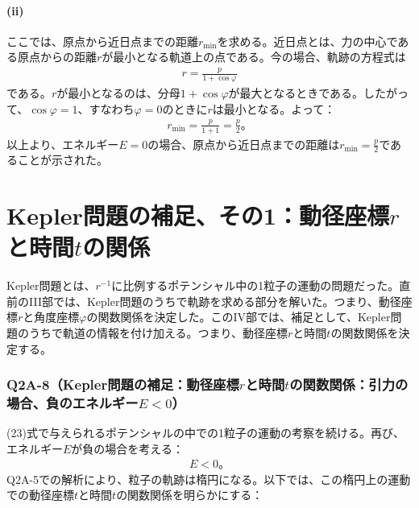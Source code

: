   \subsection*{(ii)}
  ここでは、原点から近日点までの距離$r_{\min}$を求める。近日点とは、力の中心である原点からの距離$r$が最小となる軌道上の点である。今の場合、軌跡の方程式は
  \begin{align*}
    r=\frac{p}{1+\cos\varphi}
  \end{align*}
  である。$r$が最小となるのは、分母$1+\cos\varphi$が最大となるときである。したがって、$\cos\varphi=1$、すなわち$\varphi=0$のときに$r$は最小となる。よって：
  \begin{align*}
    r_{\min}=\frac{p}{1+1}=\frac{p}{2}。\tag{44}
  \end{align*}
  以上より、エネルギー$E=0$の場合、原点から近日点までの距離は$r_{\min}=\frac p2$であることが示された。

  \clearpage
  \part{Kepler問題の補足、その1：動径座標$r$と時間$t$の関係}
  Kepler問題とは、$r^{-1}$に比例するポテンシャル中の1粒子の運動の問題だった。直前のIII部では、Kepler問題のうちで軌跡を求める部分を解いた。つまり、動径座標$r$と角度座標$\varphi$の関数関係を決定した。このIV部では、補足として、Kepler問題のうちで軌道の情報を付け加える。つまり、動径座標$r$と時間$t$の関数関係を決定する。

  \section{Q2A-8（Kepler問題の補足：動径座標$r$と時間$t$の関数関係：引力の場合、負のエネルギー$E<0$）}
  (23)式で与えられるポテンシャルの中での1粒子の運動の考察を続ける。再び、エネルギー$E$が負の場合を考える：
  \begin{align*}
    E<0。\tag{45}
  \end{align*}
  Q2A-5での解析により、粒子の軌跡は楕円になる。以下では、この楕円上の運動での動径座標$t$と時間$t$の関数関係を明らかにする：
